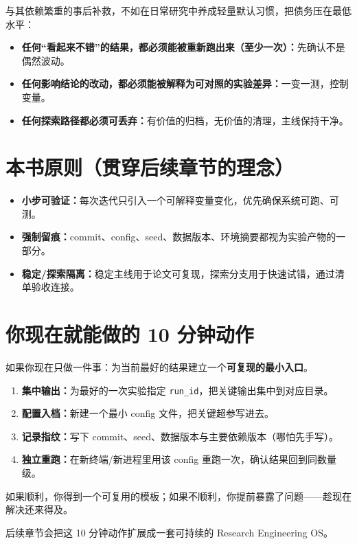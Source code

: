 与其依赖繁重的事后补救，不如在日常研究中养成轻量默认习惯，把债务压在最低水平：
\begin{itemize}
  \item \textbf{任何“看起来不错”的结果，都必须能被重新跑出来（至少一次）：}先确认不是偶然波动。
  \item \textbf{任何影响结论的改动，都必须能被解释为可对照的实验差异：}一变一测，控制变量。
  \item \textbf{任何探索路径都必须可丢弃：}有价值的归档，无价值的清理，主线保持干净。
\end{itemize}

\section{本书原则（贯穿后续章节的理念）}
\begin{itemize}
  \item \textbf{小步可验证：}每次迭代只引入一个可解释变量变化，优先确保系统可跑、可测。
  \item \textbf{强制留痕：}commit、config、seed、数据版本、环境摘要都视为实验产物的一部分。
  \item \textbf{稳定/探索隔离：}稳定主线用于论文可复现，探索分支用于快速试错，通过清单验收连接。
\end{itemize}

\section{你现在就能做的 10 分钟动作}
如果你现在只做一件事：为当前最好的结果建立一个\textbf{可复现的最小入口}。
\begin{enumerate}
  \item \textbf{集中输出：}为最好的一次实验指定 \texttt{run\_id}，把关键输出集中到对应目录。
  \item \textbf{配置入档：}新建一个最小 config 文件，把关键超参写进去。
  \item \textbf{记录指纹：}写下 commit、seed、数据版本与主要依赖版本（哪怕先手写）。
  \item \textbf{独立重跑：}在新终端/新进程里用该 config 重跑一次，确认结果回到同数量级。
\end{enumerate}

如果顺利，你得到一个可复用的模板；如果不顺利，你提前暴露了问题——趁现在解决还来得及。

后续章节会把这 10 分钟动作扩展成一套可持续的 Research Engineering OS。